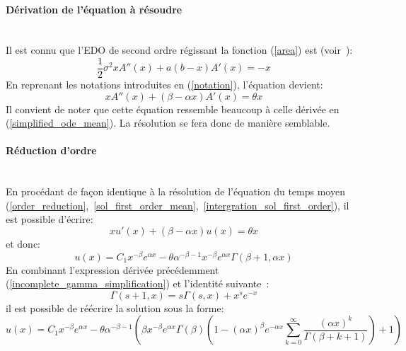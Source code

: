 \paragraph{Dérivation de l'équation à résoudre}\phantom{}\\
Il est connu que l'\acs{EDO} de second ordre régissant la fonction (\ref{area}) est (voir~\cite{abundo2013}): 
\[\frac{1}{2}\sigma^2xA''(x)+a(b-x)A'(x)=-x\]
En reprenant les notations introduites en (\ref{notation}), l'équation devient: 
\[xA''(x)+(\beta-\alpha x)A'(x)=\theta x\]
Il convient de noter que cette équation ressemble beaucoup à celle dérivée en (\ref{simplified_ode_mean}). La résolution se fera donc de manière semblable.
\paragraph{Réduction d'ordre}\phantom{}\\
En procédant de façon identique à la résolution de l'équation du temps moyen (\ref{order_reduction},~\ref{sol_first_order_mean},~\ref{intergration_sol_first_order}), il est possible d'écrire: 
\[xu'(x)+(\beta-\alpha x)u(x)=\theta x\]
et donc: 
\[u(x)=C_1x^{-\beta} e^{\alpha x} -\theta\alpha^{-\beta-1}x^{-\beta} e^{\alpha x}\Gamma(\beta+1, \alpha x)\]
En combinant l'expression dérivée précédemment (\ref{incomplete_gamma_simplification}) et l'identité suivante~\cite{NIST:DLMF}: 
\[\Gamma(s+1, x)=s\Gamma(s, x)+x^s e^{-x}\]
il est possible de réécrire la solution sous la forme: 
\[
u(x)=C_1x^{-\beta} e^{\alpha x} -\theta\alpha^{-\beta-1}\left(\beta x^{-\beta}e^{\alpha x}\Gamma(\beta)\left(1-{(\alpha x)}^\beta e^{-\alpha x}\sum_{k=0}^{\infty} \frac{{(\alpha x)}^k}{\Gamma(\beta+k+1)}\right)+1\right)
\]


